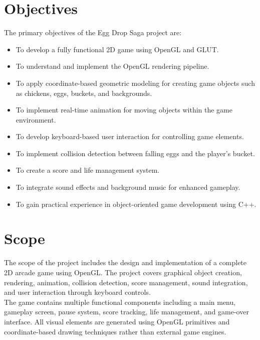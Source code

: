 \documentclass[12pt,a4paper]{report}
\begin{document}
\newpage
\section{Objectives}
The primary objectives of the Egg Drop Saga project are:

\begin{itemize}
\item To develop a fully functional 2D game using OpenGL and GLUT.

\item To understand and implement the OpenGL rendering pipeline.

\item To apply coordinate-based geometric modeling for creating game objects such as chickens, eggs, buckets, and backgrounds.

\item To implement real-time animation for moving objects within the game environment.

\item To develop keyboard-based user interaction for controlling game elements.

\item To implement collision detection between falling eggs and the player's bucket.

\item To create a score and life management system.

\item To integrate sound effects and background music for enhanced gameplay.

\item To gain practical experience in object-oriented game development using C++.


\end{itemize}

\section{Scope}

The scope of the project includes the design and implementation of a complete 2D arcade game using OpenGL. The project covers graphical object creation, rendering, animation, collision detection, score management, sound integration, and user interaction through keyboard controls.\\

The game contains multiple functional components including a main menu, gameplay screen, pause system, score tracking, life management, and game-over interface. All visual elements are generated using OpenGL primitives and coordinate-based drawing techniques rather than external game engines.\\
\end{document}

